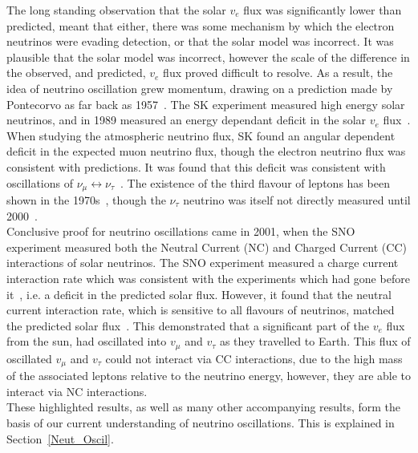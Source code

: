 The long standing observation that the solar $v_{e}$ flux was significantly lower than predicted, meant that either, there was some mechanism by which the electron neutrinos were evading detection, or that the solar model was incorrect. It was plausible that the solar model was incorrect, however the scale of the difference in the observed, and predicted, $v_{e}$ flux proved difficult to resolve. As a result, the idea of neutrino oscillation grew momentum, drawing on a prediction made by Pontecorvo as far back as 1957~\citep{Pontecorvo1957}. The SK experiment measured high energy solar neutrinos, and in 1989 measured an energy dependant deficit in the solar $v_{e}$ flux~\citep{PhysRevLett.63.16}. When studying the atmospheric neutrino flux, SK found an angular dependent deficit in the expected muon neutrino flux, though the electron neutrino flux was consistent with predictions. It was found that this deficit was consistent with oscillations of $\nu_{\mu} \leftrightarrow \nu_{\tau}$~\citep{PhysRevLett.81.1562}. The existence of the third flavour of leptons has been shown in the 1970s~\citep{PhysRevLett.35.1489}, though the $\nu_{\tau}$ neutrino was itself not directly measured until 2000~\citep{Kodama2001218}. \\

Conclusive proof for neutrino oscillations came in 2001, when the SNO experiment measured both the Neutral Current (NC) and Charged Current (CC) interactions of solar neutrinos. The SNO experiment measured a charge current interaction rate which was consistent with the experiments which had gone before it~\citep{Ahmad:2001an}, i.e. a deficit in the predicted solar flux. However, it found that the neutral current interaction rate, which is sensitive to all flavours of neutrinos, matched the predicted solar flux~\citep{PhysRevLett.89.011301}. This demonstrated that a significant part of the $v_{e}$ flux from the sun, had oscillated into $v_{\mu}$ and $v_{\tau}$ as they travelled to Earth. This flux of oscillated $v_{\mu}$ and $v_{\tau}$ could not interact via CC interactions, due to the high mass of the associated leptons relative to the neutrino energy, however, they are able to interact via NC interactions. \\

These highlighted results, as well as many other accompanying results, form the basis of our current understanding of neutrino oscillations. This is explained in Section~\ref{Neut_Oscil}. \\

